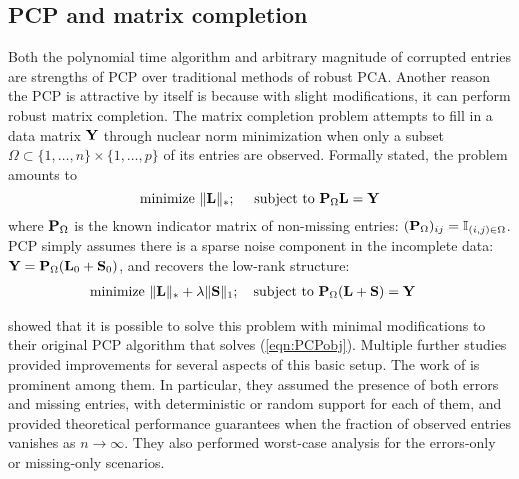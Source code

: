 \subsection*{\sffamily \large PCP and matrix completion}
Both the polynomial time algorithm and arbitrary magnitude of corrupted entries are strengths of PCP over traditional methods of robust PCA. Another reason the PCP is attractive by itself is because with slight modifications, it can perform robust matrix completion. The matrix completion problem attempts to fill in a data matrix ${\mathbf{Y}}$ through nuclear norm minimization when only a subset $\Omega \subset \{ 1, \ldots, n\} \times \{ 1, \ldots, p\}$ of its entries are observed. Formally stated, the problem amounts to
%
$$
\text{minimize } \| {\mathbf{L}} \|_*; \quad \text{ subject to } {\mathbf{P}}_\Omega {\mathbf{L}} = {\mathbf{Y}}
$$
%
where ${\mathbf{P}}_\Omega$ is the known indicator matrix of non-missing entries: $({\mathbf{P}}_\Omega)_{ij} = {\mathbb{I}}_{(i,j) \in \Omega}$. PCP simply assumes there is a sparse noise component in the incomplete data: ${\mathbf{Y}} = {\mathbf{P}}_\Omega ({\mathbf{L}}_0 + {\mathbf{S}}_0)$, and recovers the low-rank structure:
%
\begin{align}\label{eqn:PCPMCobj}
& \text{minimize } \| {\mathbf{L}} \|_* + \lambda \| {\mathbf{S}} \|_1; \quad \text{subject to } {\mathbf{P}}_\Omega({\mathbf{L}} + {\mathbf{S}}) = {\mathbf{Y}}
\end{align}
%

\cite{CandesEtal09} showed that it is possible to solve this problem with minimal modifications to their original PCP algorithm that solves (\ref{eqn:PCPobj}). Multiple further studies provided improvements for several aspects of this basic setup. The work of \cite{ChenEtal11} is prominent among them. In particular, they assumed the presence of both errors and missing entries, with deterministic or random support for each of them, and provided theoretical performance guarantees when the fraction of observed entries vanishes as $n \rightarrow \infty$. They also performed worst-case analysis for the errors-only or missing-only scenarios.

